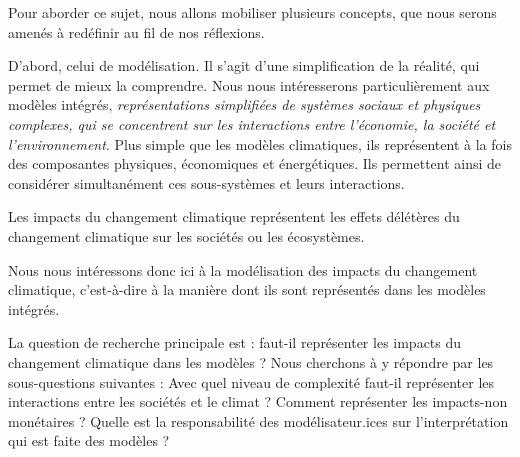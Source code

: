 
Pour aborder ce sujet, nous allons mobiliser plusieurs concepts, que nous serons amenés à redéfinir au fil de nos réflexions. 


D'abord, celui de modélisation. Il s'agit d'une simplification de la réalité, qui permet de mieux la comprendre. Nous nous intéresserons particulièrement aux modèles intégrés, \textit{représentations simplifiées de systèmes sociaux et physiques complexes, qui se concentrent sur les interactions entre l'économie, la société et l'environnement}. Plus simple que les modèles climatiques, ils représentent à la fois des composantes physiques, économiques et énergétiques. Ils permettent ainsi de considérer simultanément ces sous-systèmes et leurs interactions. 


Les impacts du changement climatique représentent les effets délétères du changement climatique sur les sociétés ou les écosystèmes. 





Nous nous intéressons donc ici à la modélisation des impacts du changement climatique, c'est-à-dire à la manière dont ils sont représentés dans les modèles intégrés. 


La question de recherche principale est : faut-il représenter les impacts du changement climatique dans les modèles ? Nous cherchons à y répondre par les sous-questions suivantes : Avec quel niveau de complexité faut-il représenter les interactions entre les sociétés et le climat ? Comment représenter les impacts-non monétaires ? Quelle est la responsabilité des modélisateur.ices sur l'interprétation qui est faite des modèles ? 



